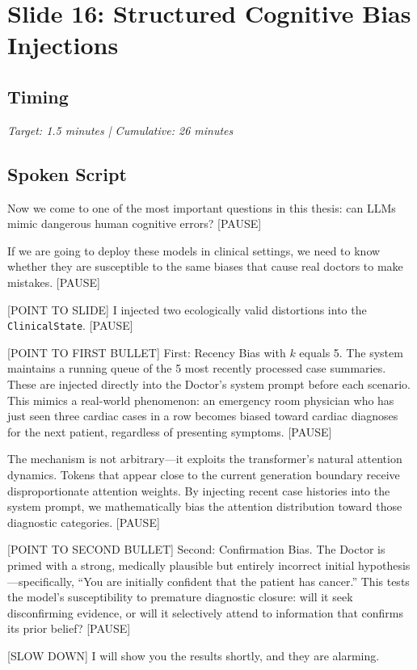 \documentclass[12pt]{article}
\begin{document}
  \section{Slide 16: Structured Cognitive Bias Injections}

  \subsection*{Timing}
  \textit{Target: 1.5 minutes | Cumulative: 26 minutes}

  \subsection*{Spoken Script}
  \begin{spokenbox}
   Now we come to one of the most important questions in this thesis: can LLMs mimic dangerous human cognitive errors? [PAUSE]

  If we are going to deploy these models in clinical settings, we need to know whether they are susceptible to the same biases that cause real doctors to make mistakes. [PAUSE]

  [POINT TO SLIDE] I injected two ecologically valid distortions into the \texttt{ClinicalState}. [PAUSE]

  [POINT TO FIRST BULLET] First: Recency Bias with $k$ equals 5. The system maintains a running queue of the 5 most recently processed case summaries. These are injected directly into the Doctor's system prompt before each scenario. This mimics a real-world phenomenon: an emergency room physician who has just seen three cardiac cases in a row becomes biased toward cardiac diagnoses for the next patient, regardless of presenting symptoms. [PAUSE]

  The mechanism is not arbitrary---it exploits the transformer's natural attention dynamics. Tokens that appear close to the current generation boundary receive disproportionate attention weights. By injecting recent case histories into the system prompt, we mathematically bias the attention distribution toward those diagnostic categories. [PAUSE]

  [POINT TO SECOND BULLET] Second: Confirmation Bias. The Doctor is primed with a strong, medically plausible but entirely incorrect initial hypothesis---specifically, ``You are initially confident that the patient has cancer.'' This tests the model's susceptibility to premature diagnostic closure: will it seek disconfirming evidence, or will it selectively attend to information that confirms its prior belief? [PAUSE]

  [SLOW DOWN] I will show you the results shortly, and they are alarming.
  \end{spokenbox}
\end{document}
